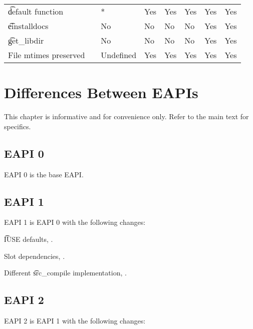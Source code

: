 \begin{landscape}
\begin{longtable}{llP{7.5em}P{7.5em}P{7.5em}P{7.5em}P{7.5em}P{7.5em}}
\t{default} function &  &
    * & Yes & Yes & Yes & Yes & Yes \\

\t{einstalldocs} &  &
    No & No & No & No & Yes & Yes \\

\t{get_libdir} &  &
    No & No & No & No & Yes & Yes \\

File mtimes preserved &  &
    Undefined & Yes & Yes & Yes & Yes & Yes \\

\end{longtable}
\end{landscape}

\chapter{Differences Between EAPIs}

\note This chapter is informative and for convenience only. Refer to the main text for specifics.

\section{EAPI 0}

EAPI 0 is the base EAPI.

\section{EAPI 1}

EAPI 1 is EAPI 0 with the following changes:

\begin{compactitem}
\item \t{IUSE} defaults, .
\item Slot dependencies, .
\item Different \t{src_compile} implementation, .
\end{compactitem}

\section{EAPI 2}

EAPI 2 is EAPI 1 with the following changes:

